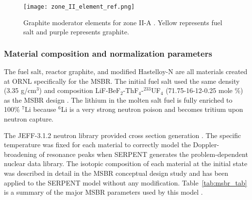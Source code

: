 \begin{figure}[ht!] %
  \texttt{[image: zone\_II\_element\_ref.png]}
  \caption{Graphite moderator elements for zone II-A 
  \cite{robertson_conceptual_1971,rykhlevskii_full-core_2017}.  Yellow 
  represents fuel salt and purple represents graphite.}
  \label{fig:II_element_ref}
\end{figure}

\subsubsection{Material composition and normalization parameters}
The fuel salt, reactor graphite, and modified Hastelloy-N
are all materials created at \gls{ORNL} specifically for the \gls{MSBR}.
The initial fuel salt used the same 
density (3.35 g/cm$^3$) and composition LiF-BeF$_2$-ThF$_4$-$^{233}$UF$_4$ 
(71.75-16-12-0.25 mole \%) as the \gls{MSBR} design 
\cite{robertson_conceptual_1971}. The lithium in the molten salt fuel is fully 
enriched to 100\% $^{7}$Li because $^{6}$Li is a very strong neutron poison and 
becomes tritium upon neutron capture. 

The JEFF-3.1.2 neutron library provided cross section generation 
\cite{oecd/nea_data_bank_jeff-3.1.2_2014}. 
The specific temperature was fixed 
for each material to correctly model the Doppler-broadening of resonance peaks 
when SERPENT generates the problem-dependent nuclear data library. The isotopic 
composition of each material at the initial state was described in detail in 
the MSBR conceptual design study \cite{robertson_conceptual_1971} and has been 
applied to the SERPENT model without any modification. Table~\ref{tab:msbr_tab} is 
a summary of the major \gls{MSBR} parameters used by this model 
\cite{robertson_conceptual_1971}. 

